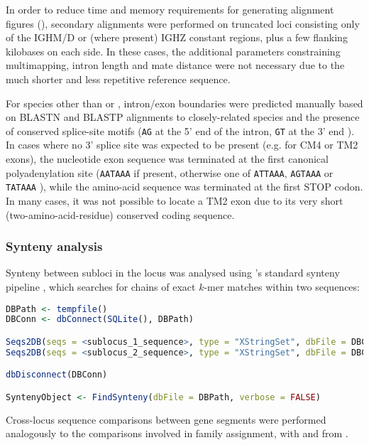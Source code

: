 In order to reduce time and memory requirements for generating alignment figures (), secondary alignments were performed on truncated loci consisting only of the IGHM/D or (where present) IGHZ constant regions, plus a few flanking kilobases on each side. In these cases, the additional parameters constraining multimapping, intron length and mate distance were not necessary due to the much shorter and less repetitive reference sequence.

For species other than \Nfu or \Xma, intron/exon boundaries were predicted manually based on BLASTN and BLASTP alignments to closely-related species and the presence of conserved splice-site motifs (\texttt{AG} at the 5' end of the intron, \texttt{GT} at the 3' end \parencite{shapiro1987splice}). In cases where no 3' splice site was expected to be present (e.g. for CM4 or TM2 exons), the nucleotide exon sequence was terminated at the first canonical polyadenylation site (\texttt{AATAAA} if present, otherwise one of \texttt{ATTAAA}, \texttt{AGTAAA} or \texttt{TATAAA} \parencite{ulitsky2012polya}), while the amino-acid sequence was terminated at the first STOP codon. In many cases, it was not possible to locate a TM2 exon due to its very short (two-amino-acid-residue) conserved coding sequence.

\subsubsection{Synteny analysis}
\label{sec:methods_comp_locus_synteny}

Synteny between subloci in the \Nfu locus was analysed using 's standard synteny pipeline \parencite{wright2016decipher}, which searches for chains of exact $k$-mer matches within two sequences:

\begin{lstlisting}[language=R]
DBPath <- tempfile()
DBConn <- dbConnect(SQLite(), DBPath)

Seqs2DB(seqs = <sublocus_1_sequence>, type = "XStringSet", dbFile = DBConn, identifier = "IGH1", verbose = FALSE)
Seqs2DB(seqs = <sublocus_2_sequence>, type = "XStringSet", dbFile = DBConn, identifier = "IGH2", verbose = FALSE)

dbDisconnect(DBConn)

SyntenyObject <- FindSynteny(dbFile = DBPath, verbose = FALSE)
\end{lstlisting}

\noindent Cross-locus sequence comparisons between gene segments were performed analogously to the comparisons involved in \vh family assignment, with  and  from .


